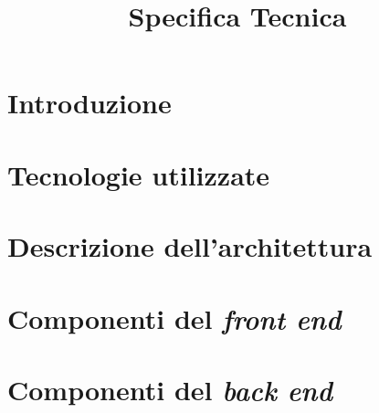 


\author{\ALL}
\supervisor{\MM}
\dest{\ALL}
\title{Specifica Tecnica}

\newcommand{\nogloxy}[1]{#1}
\newcommand{\subsubsubsection}[1]{\paragraph{#1}}
\newcommand{\textt}[1]{\texttt{#1}}


\maketitle

\tableofcontents



\section{Introduzione}


\section{Tecnologie utilizzate}


\section{Descrizione dell'architettura}


\section{Componenti del \emph{front end}} \label{sec:frontend}


\section{Componenti del \emph{back end}} \label{sec:backend}


